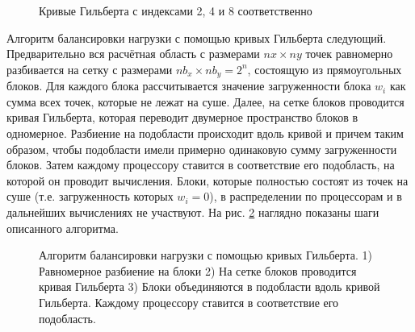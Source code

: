     \begin{figure}[htb!]
    \begin{minipage}[h]{0.3\linewidth}
    \end{minipage}
    \hfill
    \begin{minipage}[h]{0.3\linewidth}
    \end{minipage}
    \hfill
    \begin{minipage}[h]{0.3\linewidth}
    \end{minipage}
    \caption{Кривые Гильберта с индексами 2, 4 и 8 соответственно}
    \label{fig:HC}
    \end{figure}
    
Алгоритм балансировки нагрузки с помощью кривых Гильберта следующий. 
Предварительно вся расчётная область с размерами $nx \times ny$ точек равномерно разбивается
на сетку с размерами $nb_x \times nb_y = 2^n$, состоящую из прямоугольных блоков.
Для каждого блока рассчитывается значение загруженности блока $w_i$ как сумма всех точек, которые не лежат на суше.
Далее, на сетке блоков проводится кривая Гильберта, которая переводит
двумерное пространство блоков в одномерное.
Разбиение на подобласти происходит вдоль кривой и причем таким образом, чтобы
подобласти имели примерно одинаковую сумму загруженности блоков.
Затем каждому процессору ставится в соответствие его подобласть, на которой он проводит вычисления.
Блоки, которые полностью состоят из точек на суше (т.е. загруженность которых $w_i = 0$),
в распределении по процессорам и в дальнейших вычислениях не участвуют. 
На рис. \ref{fig:LBalgo} наглядно показаны шаги описанного алгоритма. 

    
    \begin{figure}[htb!]
    \begin{minipage}[h]{0.32\linewidth}
    \end{minipage}
    \hfill
    \begin{minipage}[h]{0.32\linewidth}
    \end{minipage}
    \hfill
    \begin{minipage}[h]{0.32\linewidth}
    \end{minipage}
    \caption{Алгоритм балансировки нагрузки с помощью кривых Гильберта. 1) Равномерное разбиение на блоки 
             2) На сетке блоков проводится кривая Гильберта
             3) Блоки объединяются в подобласти вдоль кривой Гильберта.
                Каждому процессору ставится в соответствие его подобласть. }
    \label{fig:LBalgo}
    \end{figure}
    

